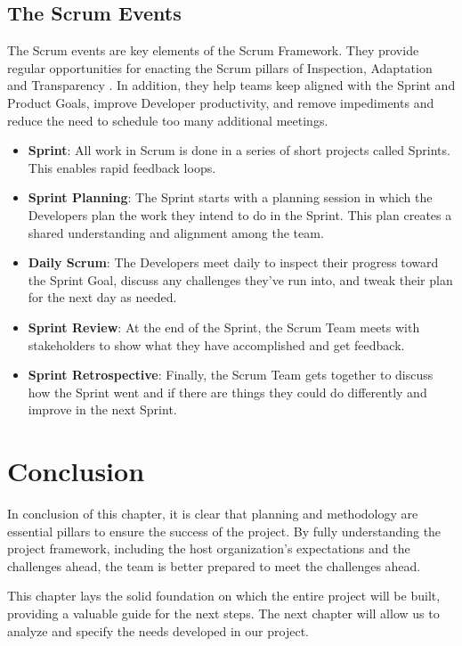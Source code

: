 \subsection{The Scrum Events}

The Scrum events are key elements of the Scrum Framework. They provide regular opportunities for enacting the Scrum pillars of Inspection, Adaptation and Transparency \cite{ScrumGuide2020}. In addition, they help teams keep aligned with the Sprint and Product Goals, improve Developer productivity, and remove impediments and reduce the need to schedule too many additional meetings.

\begin{itemize}
    \item \textbf{Sprint}: All work in Scrum is done in a series of short projects called Sprints. This enables rapid feedback loops.
    
    \item \textbf{Sprint Planning}: The Sprint starts with a planning session in which the Developers plan the work they intend to do in the Sprint. This plan creates a shared understanding and alignment among the team.
    
    \item \textbf{Daily Scrum}: The Developers meet daily to inspect their progress toward the Sprint Goal, discuss any challenges they've run into, and tweak their plan for the next day as needed.
    
    \item \textbf{Sprint Review}: At the end of the Sprint, the Scrum Team meets with stakeholders to show what they have accomplished and get feedback.
    
    \item \textbf{Sprint Retrospective}: Finally, the Scrum Team gets together to discuss how the Sprint went and if there are things they could do differently and improve in the next Sprint.
\end{itemize}

\section{Conclusion}

In conclusion of this chapter, it is clear that planning and methodology are essential pillars to ensure the success of the project. By fully understanding the project framework, including the host organization's expectations and the challenges ahead, the team is better prepared to meet the challenges ahead.

This chapter lays the solid foundation on which the entire project will be built, providing a valuable guide for the next steps. The next chapter will allow us to analyze and specify the needs developed in our project. 